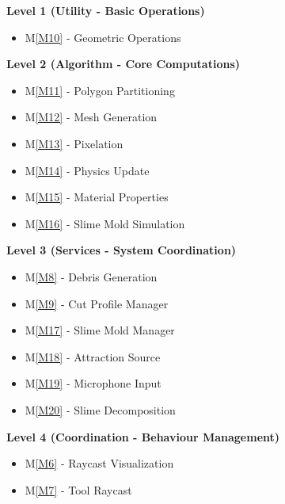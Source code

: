 \documentclass[12pt, titlepage]{article}
\newcommand{\mref}[1]{M\ref{#1}}
\begin{document}
\vspace{5mm}

\noindent
\textbf{Level 1 (Utility - Basic Operations)}\\
\begin{itemize}
\item \mref{M10} - Geometric Operations
\end{itemize}

\vspace{5mm}

\noindent
\textbf{Level 2 (Algorithm - Core Computations)}\\
\begin{itemize}
\item \mref{M11} - Polygon Partitioning
\item \mref{M12} - Mesh Generation
\item \mref{M13} - Pixelation
\item \mref{M14} - Physics Update
\item \mref{M15} - Material Properties
\item \mref{M16} - Slime Mold Simulation
\end{itemize}

\vspace{5mm}

\noindent
\textbf{Level 3 (Services - System Coordination)}\\
\begin{itemize}
\item \mref{M8} - Debris Generation
\item \mref{M9} - Cut Profile Manager
\item \mref{M17} - Slime Mold Manager
\item \mref{M18} - Attraction Source
\item \mref{M19} - Microphone Input
\item \mref{M20} - Slime Decomposition
\end{itemize}

\vspace{5mm}

\noindent
\textbf{Level 4 (Coordination - Behaviour Management)}\\
\begin{itemize}
\item \mref{M6} - Raycast Visualization
\item \mref{M7} - Tool Raycast
\end{itemize}

\vspace{5mm}
\end{document}
